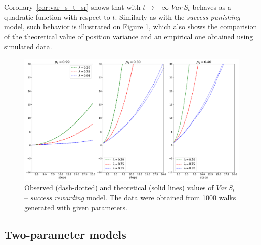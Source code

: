 \documentclass[runningheads]{CMSIM}
\begin{document}
    Corollary~\ref{cor:var_s_t_sr} shows that with $t\rightarrow+\infty$
    $Var\,S_{t}$ behaves as a quadratic function with respect to $t$.
    Similarly as with the \emph{success punishing} model, such behavior
    is illustrated on Figure \ref{fig:var_s_t_sr}, which also shows
    the comparision of the theoretical value of position variance and
    an empirical one obtained using simulated data.

    \begin{figure}
        \includegraphics[width=1\textwidth]{../simulations/e_position_1000_walks_20_steps_type_success_rewarded}

        \caption{\label{fig:var_s_t_sr}Observed (dash-dotted) and theoretical (solid
        lines) values of $Var\,S_{t}$ -- \emph{success rewarding }model.
        The
        data were obtained from 1000 walks generated with given parameters. }

    \end{figure}

    \subsection{Two-parameter models}\label{subsec:two-parameter-models}
\end{document}
